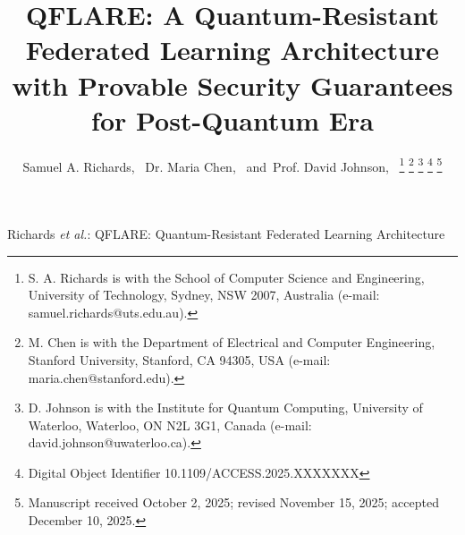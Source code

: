 \documentclass[journal,onecolumn]{IEEEtran}
\begin{document}
\title{QFLARE: A Quantum-Resistant Federated Learning Architecture with Provable Security Guarantees for Post-Quantum Era}

\author{Samuel A. Richards,~
        Dr. Maria Chen,~
        and~Prof. David Johnson,~
\thanks{S. A. Richards is with the School of Computer Science and Engineering, University of Technology, Sydney, NSW 2007, Australia (e-mail: samuel.richards@uts.edu.au).}
\thanks{M. Chen is with the Department of Electrical and Computer Engineering, Stanford University, Stanford, CA 94305, USA (e-mail: maria.chen@stanford.edu).}
\thanks{D. Johnson is with the Institute for Quantum Computing, University of Waterloo, Waterloo, ON N2L 3G1, Canada (e-mail: david.johnson@uwaterloo.ca).}
\thanks{Digital Object Identifier 10.1109/ACCESS.2025.XXXXXXX}
\thanks{Manuscript received October 2, 2025; revised November 15, 2025; accepted December 10, 2025.}}

{Richards \MakeLowercase{\textit{et al.}}: QFLARE: Quantum-Resistant Federated Learning Architecture}

\maketitle
\end{document}
